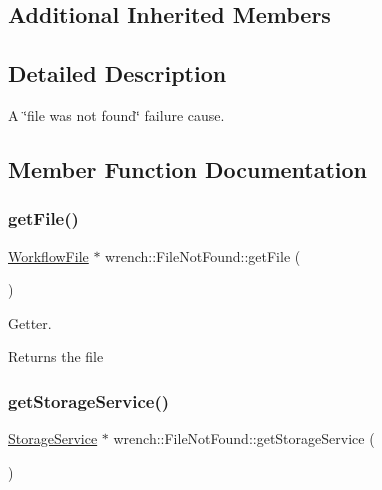 \subsection*{Additional Inherited Members}


\subsection{Detailed Description}
A \char`\"{}file was not found\char`\"{} failure cause. 

\subsection{Member Function Documentation}
\mbox{\label{classwrench_1_1_file_not_found_aa89df5eaeb42af70876ac6ce084de33d}} 
\subsubsection{\texorpdfstring{get\+File()}{getFile()}}
{\footnotesize\ttfamily \hyperlink{classwrench_1_1_workflow_file}{Workflow\+File} $\ast$ wrench\+::\+File\+Not\+Found\+::get\+File (\begin{DoxyParamCaption}{ }\end{DoxyParamCaption})}



Getter. 

\begin{DoxyReturn}{Returns}
the file 
\end{DoxyReturn}
\mbox{\label{classwrench_1_1_file_not_found_ac831b3a371f81e56bfac869fd4113514}} 
\subsubsection{\texorpdfstring{get\+Storage\+Service()}{getStorageService()}}
{\footnotesize\ttfamily \hyperlink{classwrench_1_1_storage_service}{Storage\+Service} $\ast$ wrench\+::\+File\+Not\+Found\+::get\+Storage\+Service (\begin{DoxyParamCaption}{ }\end{DoxyParamCaption})}



